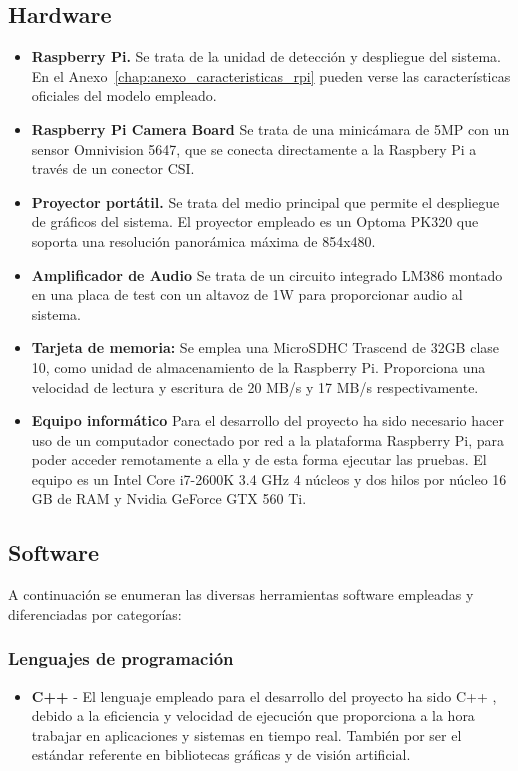 \subsection{Hardware}
\begin{itemize}
\item \textbf{Raspberry Pi.} Se trata de la unidad de detección y despliegue del sistema. En el Anexo~\ref{chap:anexo_caracteristicas_rpi} pueden verse las características oficiales del modelo empleado.
\item \textbf{Raspberry Pi Camera Board}  Se trata de una minicámara de 5MP con un sensor Omnivision 5647, que se conecta directamente a la Raspbery Pi a través de un conector CSI.
\item \textbf{Proyector portátil.} Se trata del medio principal que permite el despliegue de gráficos del sistema. El proyector empleado es un Optoma PK320 que soporta una resolución panorámica máxima de 854x480. 
\item \textbf{Amplificador de Audio} Se trata de un circuito integrado LM386 montado en una placa de test con un altavoz de 1W para proporcionar audio al sistema.
\item \textbf{Tarjeta de memoria:} Se emplea una MicroSDHC Trascend de 32GB clase 10, como unidad de almacenamiento de la Raspberry Pi. Proporciona una velocidad de lectura y escritura de 20 MB/s y 17 MB/s respectivamente. 
\item \textbf{Equipo informático}  Para el desarrollo del proyecto ha sido necesario hacer uso de un computador conectado por red a la plataforma Raspberry Pi, para poder acceder remotamente a ella y de esta forma ejecutar las pruebas. El equipo es un Intel Core i7-2600K 3.4 GHz 4 núcleos y dos hilos por núcleo 16 GB de RAM y Nvidia GeForce GTX 560 Ti.

\end{itemize}

\subsection{Software}
A continuación se enumeran las diversas herramientas software empleadas y diferenciadas por categorías:

\subsubsection{Lenguajes de programación}
\begin{itemize}
\item \textbf{C++} - El lenguaje empleado para el desarrollo del proyecto ha sido C++ \cite{Stroustrup00}, debido a la eficiencia y velocidad de ejecución que proporciona a la hora trabajar en aplicaciones y sistemas en tiempo real. También por ser el estándar referente en bibliotecas gráficas y de visión artificial.
\end{itemize}


